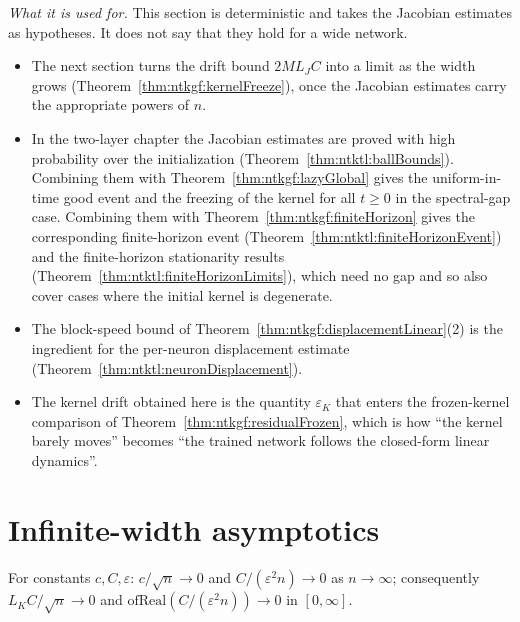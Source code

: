 \begin{remark}
\emph{What it is used for.} This section is deterministic and takes the Jacobian estimates as hypotheses. It does not say that they hold for a wide network.
\begin{itemize}
  \item The next section turns the drift bound $2ML_JC$ into a limit as the width grows (Theorem~\ref{thm:ntkgf:kernelFreeze}), once the Jacobian estimates carry the appropriate powers of $n$.
  \item In the two-layer chapter the Jacobian estimates are proved with high probability over the initialization (Theorem~\ref{thm:ntktl:ballBounds}). Combining them with Theorem~\ref{thm:ntkgf:lazyGlobal} gives the uniform-in-time good event and the freezing of the kernel for all $t\ge0$ in the spectral-gap case. Combining them with Theorem~\ref{thm:ntkgf:finiteHorizon} gives the corresponding finite-horizon event (Theorem~\ref{thm:ntktl:finiteHorizonEvent}) and the finite-horizon stationarity results (Theorem~\ref{thm:ntktl:finiteHorizonLimits}), which need no gap and so also cover cases where the initial kernel is degenerate.
  \item The block-speed bound of Theorem~\ref{thm:ntkgf:displacementLinear}(2) is the ingredient for the per-neuron displacement estimate (Theorem~\ref{thm:ntktl:neuronDisplacement}).
  \item The kernel drift obtained here is the quantity $\varepsilon_K$ that enters the frozen-kernel comparison of Theorem~\ref{thm:ntkgf:residualFrozen}, which is how ``the kernel barely moves'' becomes ``the trained network follows the closed-form linear dynamics''.
\end{itemize}
\end{remark}


\section{Infinite-width asymptotics}\label{sec:ntkgf:infiniteWidth}

\begin{lemma}\label{lem:ntkgf:limits}
  \leanok
For constants $c,C,\varepsilon$: $c/\sqrt n\to0$ and $C/(\varepsilon^2n)\to0$ as $n\to\infty$; consequently $L_KC/\sqrt n\to0$ and $\mathrm{ofReal}(C/(\varepsilon^2n))\to0$ in $[0,\infty]$.
\end{lemma}

